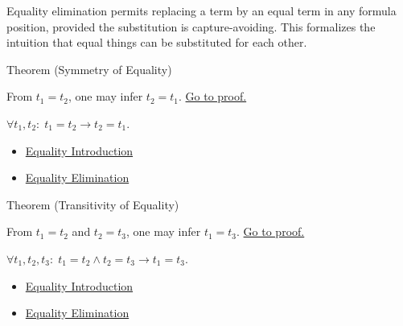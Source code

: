 \begin{remark*}
Equality elimination permits replacing a term by an equal term in any formula
position, provided the substitution is capture-avoiding. This formalizes the
intuition that equal things can be substituted for each other.
\end{remark*}


\begin{theorembox}{Theorem (Symmetry of Equality)}
\begin{theorem}\label{thm:eq-sym}
From $t_1 = t_2$, one may infer $t_2 = t_1$.
\hyperref[prf:eq-sym]{Go to proof.}
\end{theorem}
\end{theorembox}

\begin{remark*}
$\forall t_1, t_2:\; t_1=t_2 \to t_2=t_1$.
\end{remark*}


\begin{dependencies}
\begin{itemize}
  \item \hyperref[def:eq-refl]{Equality Introduction}
  \item \hyperref[def:eq-elim]{Equality Elimination}
\end{itemize}
\end{dependencies}

\begin{theorembox}{Theorem (Transitivity of Equality)}
\begin{theorem}\label{thm:eq-trans}
From $t_1 = t_2$ and $t_2 = t_3$, one may infer $t_1 = t_3$.
\hyperref[prf:eq-trans]{Go to proof.}
\end{theorem}
\end{theorembox}

\begin{remark*}
$\forall t_1, t_2, t_3:\; t_1=t_2 \wedge t_2=t_3 \to t_1=t_3$.
\end{remark*}


\begin{dependencies}
\begin{itemize}
  \item \hyperref[def:eq-refl]{Equality Introduction}
  \item \hyperref[def:eq-elim]{Equality Elimination}
\end{itemize}
\end{dependencies}

